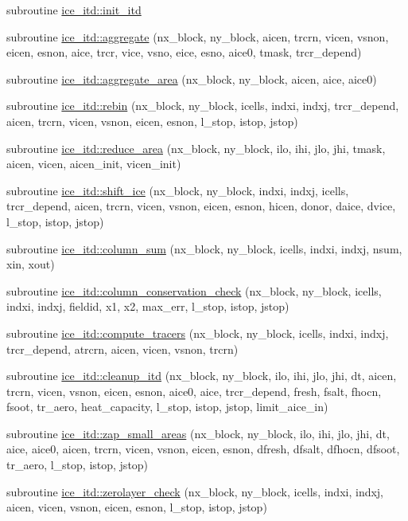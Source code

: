 \begin{DoxyCompactItemize}
\item 
subroutine \hyperlink{namespaceice__itd_a2c5da98ae0797cd69f98ffce134e4ef7}{ice\_\-itd::init\_\-itd}
\item 
subroutine \hyperlink{namespaceice__itd_a8360ff94dd398d403890bfe9e8030b51}{ice\_\-itd::aggregate} (nx\_\-block, ny\_\-block, aicen, trcrn, vicen, vsnon, eicen, esnon, aice, trcr, vice, vsno, eice, esno, aice0, tmask, trcr\_\-depend)
\item 
subroutine \hyperlink{namespaceice__itd_a428ffa5cfc4adb00cd323a2d76bf1c4d}{ice\_\-itd::aggregate\_\-area} (nx\_\-block, ny\_\-block, aicen, aice, aice0)
\item 
subroutine \hyperlink{namespaceice__itd_a9c2920aedaba5102293185bec0142577}{ice\_\-itd::rebin} (nx\_\-block, ny\_\-block, icells, indxi, indxj, trcr\_\-depend, aicen, trcrn, vicen, vsnon, eicen, esnon, l\_\-stop, istop, jstop)
\item 
subroutine \hyperlink{namespaceice__itd_aebf0bc54e5651ee1e36e7562ecaa4d73}{ice\_\-itd::reduce\_\-area} (nx\_\-block, ny\_\-block, ilo, ihi, jlo, jhi, tmask, aicen, vicen, aicen\_\-init, vicen\_\-init)
\item 
subroutine \hyperlink{namespaceice__itd_aa67e5ce0b62a39a084d0058459df445e}{ice\_\-itd::shift\_\-ice} (nx\_\-block, ny\_\-block, indxi, indxj, icells, trcr\_\-depend, aicen, trcrn, vicen, vsnon, eicen, esnon, hicen, donor, daice, dvice, l\_\-stop, istop, jstop)
\item 
subroutine \hyperlink{namespaceice__itd_acc3eccaeb97f8a721fd0b9127b1fa183}{ice\_\-itd::column\_\-sum} (nx\_\-block, ny\_\-block, icells, indxi, indxj, nsum, xin, xout)
\item 
subroutine \hyperlink{namespaceice__itd_a6371b4812310c8ffbdf11c024b9e0c5a}{ice\_\-itd::column\_\-conservation\_\-check} (nx\_\-block, ny\_\-block, icells, indxi, indxj, fieldid, x1, x2, max\_\-err, l\_\-stop, istop, jstop)
\item 
subroutine \hyperlink{namespaceice__itd_ae64b7540ec9e84001de195ffec097bc3}{ice\_\-itd::compute\_\-tracers} (nx\_\-block, ny\_\-block, icells, indxi, indxj, trcr\_\-depend, atrcrn, aicen, vicen, vsnon, trcrn)
\item 
subroutine \hyperlink{namespaceice__itd_a3e9112301701b3265ffbd9273598a98d}{ice\_\-itd::cleanup\_\-itd} (nx\_\-block, ny\_\-block, ilo, ihi, jlo, jhi, dt, aicen, trcrn, vicen, vsnon, eicen, esnon, aice0, aice, trcr\_\-depend, fresh, fsalt, fhocn, fsoot, tr\_\-aero, heat\_\-capacity, l\_\-stop, istop, jstop, limit\_\-aice\_\-in)
\item 
subroutine \hyperlink{namespaceice__itd_a137780a223f20265133e26e9e96d36a5}{ice\_\-itd::zap\_\-small\_\-areas} (nx\_\-block, ny\_\-block, ilo, ihi, jlo, jhi, dt, aice, aice0, aicen, trcrn, vicen, vsnon, eicen, esnon, dfresh, dfsalt, dfhocn, dfsoot, tr\_\-aero, l\_\-stop, istop, jstop)
\item 
subroutine \hyperlink{namespaceice__itd_a55c2adda4305308869dac586cefe447a}{ice\_\-itd::zerolayer\_\-check} (nx\_\-block, ny\_\-block, icells, indxi, indxj, aicen, vicen, vsnon, eicen, esnon, l\_\-stop, istop, jstop)
\end{DoxyCompactItemize}
